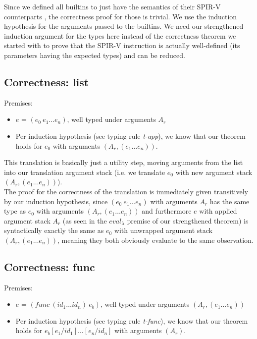 \documentclass[letterpaper,12pt]{article}
\begin{document}
Since we defined all builtins to just have the semantics of their
SPIR-V counterparts 
, the correctness proof for those is trivial. We use the
induction hypothesis for the arguments passed to the builtins.
We need our strengthened induction argument for the types here
instead of the correctness theorem we started with to prove
that the SPIR-V instruction is actually well-defined (its parameters
having the expected types) and can be reduced.

\subsection{Correctness: list}


Premises:
\begin{itemize}
	\item $e$ = $(e_0\: e_1 \dots e_n)$, well typed under arguments $A_r$
	\item Per induction hypothesis (see typing rule \textit{t-app}), we
		know that our theorem holds for $e_0$ with arguments
		$(A_r, (e_1 \dots e_n))$.
\end{itemize}

This translation is basically just a utility step, moving arguments
from the list into our translation argument stack (i.e. we translate
$e_0$ with new argument stack $(A_r, (e_1 \dots e_n))$). \\
The proof for the correctness of the translation is immediately given transitively
by our induction hypothesis, since $(e_0\: e_1 \dots e_n)$ with arguments 
$A_r$ has the same type as $e_0$ with arguments $(A_r, (e_1 \dots e_n))$
and furthermore $e$ with applied argument stack $A_r$ (as seen in the $eval_\lambda$
premise of our strengthened theorem) is syntactically
exactly the same as $e_0$ with unwrapped argument stack $(A_r, (e_1 \dots e_n))$,
meaning they both obviously evaluate to the same observation.

\subsection{Correctness: func}

Premises:
\begin{itemize}
	\item $e$ = $(func\: (id_1 \dots id_n)\: e_b)$, well typed
		under arguments $(A_r, (e_1 \dots e_n))$
	\item Per induction hypothesis (see typing rule \textit{t-func}), we
		know that our theorem holds for $e_b[e_1 / id_1]\dots[e_n / id_n]$ with arguments
		$(A_r)$.
\end{itemize}
\end{document}
